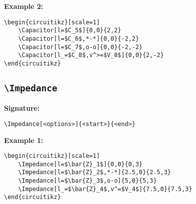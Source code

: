 \documentclass[a4paper,12pt]{article}
\begin{document}
\begin{center}
\begin{circuitikz}[scale=1]
\end{circuitikz}
\end{center}

\textbf{Example 2:}

\begin{lstlisting}[style=latexstyle]
\begin{circuitikz}[scale=1]
	\Capacitor[l=$C_5$]{0,0}{2,2}
	\Capacitor[l=$C_6$,*-*]{0,0}{-2,2}
	\Capacitor[l=$C_7$,o-o]{0,0}{-2,-2}
	\Capacitor[l_=$C_8$,v^>=$V_8$]{0,0}{2,-2}
\end{circuitikz}
\end{lstlisting}

\begin{center}
\begin{circuitikz}[scale=1]
\end{circuitikz}
\end{center}

\subsection{\texttt{\textbackslash Impedance}}

\textbf{Signature:}
\begin{verbatim}
\Impedance[<options>]{<start>}{<end>}
\end{verbatim}

\textbf{Example 1:}

\begin{lstlisting}[style=latexstyle]
\begin{circuitikz}[scale=1]
	\Impedance[l=$\bar{Z}_1$]{0,0}{0,3}
	\Impedance[l=$\bar{Z}_2$,*-*]{2.5,0}{2.5,3}
	\Impedance[l=$\bar{Z}_3$,o-o]{5,0}{5,3}
	\Impedance[l_=$\bar{Z}_4$,v^=$V_4$]{7.5,0}{7.5,3}
\end{circuitikz}
\end{lstlisting}


\begin{center}
\begin{circuitikz}[scale=1]
\end{circuitikz}
\end{center}
\end{document}

